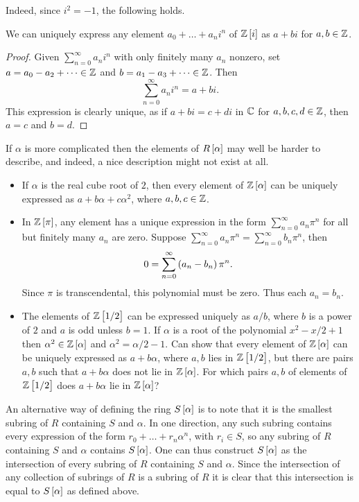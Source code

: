 Indeed, since $ i^2 = -1 $, the following holds.

\begin{proposition}
We can uniquely express any element $ a_0 + \dots + a_ni^n $ of $ \Z\sbr{i} $ as $ a + bi $ for $ a, b \in \mathbb{Z} $.
\end{proposition}

\begin{proof}
Given $ \sum_{n = 0}^\infty a_ni^n $ with only finitely many $ a_n $ nonzero, set $ a = a_0 - a_2 + \dots \in \mathbb{Z} $ and $ b = a_1 - a_3 + \dots \in \mathbb{Z} $. Then
$$ \sum_{n = 0}^\infty a_ni^n = a + bi. $$
This expression is clearly unique, as if $ a + bi = c + di $ in $ \mathbb{C} $ for $ a, b, c, d \in \mathbb{Z} $, then $ a = c $ and $ b = d $.
\end{proof}

If $ \alpha $ is more complicated then the elements of $ R\sbr{\alpha} $ may well be harder to describe, and indeed, a nice description might not exist at all.

\begin{example*}
\hfill
\begin{itemize}
\item If $ \alpha $ is the real cube root of $ 2 $, then every element of $ \Z\sbr{\alpha} $ can be uniquely expressed as $ a + b\alpha + c\alpha^2 $, where $ a, b, c \in \mathbb{Z} $.
\item In $ \Z\sbr{\pi} $, any element has a unique expression in the form $ \sum_{n = 0}^\infty a_n\pi^n $ for all but finitely many $ a_n $ are zero. Suppose $ \sum_{n = 0}^\infty a_n\pi^n = \sum_{n = 0}^\infty b_n\pi^n $, then
$$ 0 = \sum_{n = 0}^\infty \br{a_n - b_n}\pi^n. $$
Since $ \pi $ is transcendental, this polynomial must be zero. Thus each $ a_n = b_n $.
\item The elements of $ \Z\sbr{1 / 2} $ can be expressed uniquely as $ a / b $, where $ b $ is a power of $ 2 $ and $ a $ is odd unless $ b = 1 $. If $ \alpha $ is a root of the polynomial $ x^2 - x / 2 + 1 $ then $ \alpha^2 \in \Z\sbr{\alpha} $ and $ \alpha^2 = \alpha / 2 - 1 $. Can show that every element of $ \Z\sbr{\alpha} $ can be uniquely expressed as $ a + b\alpha $, where $ a, b $ lies in $ \Z\sbr{1 / 2} $, but there are pairs $ a, b $ such that $ a + b\alpha $ does not lie in $ \Z\sbr{\alpha} $. For which pairs $ a, b $ of elements of $ \Z\sbr{1 / 2} $ does $ a + b\alpha $ lie in $ \Z\sbr{\alpha} $?
\end{itemize}
\end{example*}

An alternative way of defining the ring $ S\sbr{\alpha} $ is to note that it is the smallest subring of $ R $ containing $ S $ and $ \alpha $. In one direction, any such subring contains every expression of the form $ r_0 + \dots + r_n\alpha^n $, with $ r_i \in S $, so any subring of $ R $ containing $ S $ and $ \alpha $ contains $ S\sbr{\alpha} $. One can thus construct $ S\sbr{\alpha} $ as the intersection of every subring of $ R $ containing $ S $ and $ \alpha $. Since the intersection of any collection of subrings of $ R $ is a subring of $ R $ it is clear that this intersection is equal to $ S\sbr{\alpha} $ as defined above.

